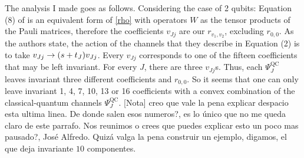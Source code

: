 \documentclass[11pt]{article}
\begin{document}
The analysis I made goes as follows. Considering the case of 2 qubits: Equation (8) of \cite{nathanson2007pauli} is an
equivalent form of \eqref{rho} with operators $W$ as the tensor products of the Pauli matrices, therefore the coefficients
$v_{Jj}$ are our $r_{v_1,v_2}$, excluding $r_{0,0}$. As the authors state, the action of the channels that they describe in Equation (2)
is to take $v_{Jj}\to \qty(s+t_J)v_{Jj}$. Every $v_{Jj}$ corresponds to one of the fifteen coefficients that may be left invariant.
For every $J$, there are three $v_{Jj}$s. Thus, each $\Psi ^{\text{QC}}_J$ leaves invariant three different
coefficients and $r_{0,0}$. So it seems that one can only leave invariant 1, 4, 7, 10, 13 or 16 coefficients with a convex
combination of the classical-quantum channels $\Psi ^{\text{QC}}_J$. {\color{red} [Nota] creo que vale la pena explicar despacio esta ultima linea. De donde salen esos numeros?, es lo único que no me queda claro de este parrafo. Nos reunimos o crees que puedes explicar esto un poco mas pausado?, José Alfredo. Quizá valga la pena construir un ejemplo, digamos, el que deja invariante $10$ componentes.}



\end{document}
